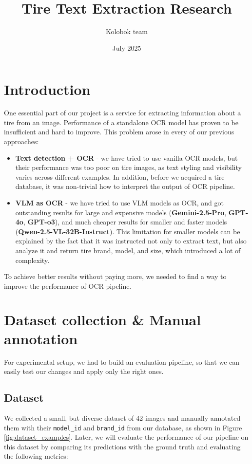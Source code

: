 \documentclass{article}
\author{Kolobok team}
\title{Tire Text Extraction Research}
\date{July 2025}
\begin{document}
\maketitle

\section{Introduction}

One essential part of our project is a service for extracting information about a tire from an image. Performance of a standalone OCR model has proven to be insufficient and hard to improve. This problem arose in every of our previous approaches:

\begin{itemize}
    \item \textbf{Text detection + OCR} - we have tried to use vanilla OCR models, but their performance was too poor on tire images, as text styling and visibility varies across different examples. In addition, before we acquired a tire database, it was non-trivial how to interpret the output of OCR pipeline.
    \item \textbf{VLM as OCR} - we have tried to use VLM models as OCR, and got outstanding results for large and expensive models (\textbf{Gemini-2.5-Pro}, \textbf{GPT-4o}, \textbf{GPT-o3}), and much cheaper results for smaller and faster models (\textbf{Qwen-2.5-VL-32B-Instruct}). This limitation for smaller models can be explained by the fact that it was instructed not only to extract text, but also analyze it and return tire brand, model, and size, which introduced a lot of complexity.
\end{itemize}

To achieve better results without paying more, we needed to find a way to improve the performance of OCR pipeline.

\section{Dataset collection \& Manual annotation}

For experimental setup, we had to build an evaluation pipeline, so that we can easily test our changes and apply only the right ones.

\subsection{Dataset}

We collected a small, but diverse dataset of 42 images and manually annotated them with their \texttt{model\_id} and \texttt{brand\_id} from our database, as shown in Figure \ref{fig:dataset_examples}. Later, we will evaluate the performance of our pipeline on this dataset by comparing its predictions with the ground truth and evaluating the following metrics:
\end{document}

